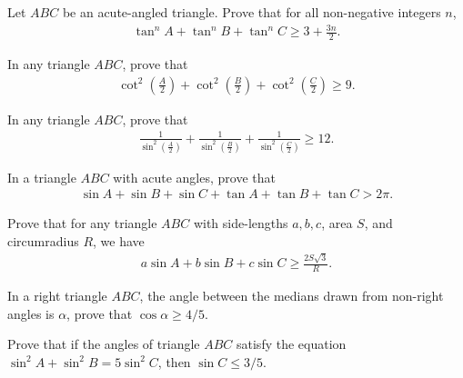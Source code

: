 \documentclass[12pt,a4paper]{memoir}
\theoremstyle{definition}
\begin{document}
\begin{question}
	Let $ABC$ be an acute-angled triangle. Prove that for all non-negative integers $n$,
	\begin{align*}
		\tan^n A + \tan^n B + \tan^n C \geq 3+\frac{3n}{2}.
	\end{align*}
\end{question}


\begin{question}
	In any triangle $ABC$, prove that
	\begin{align*}
		\cot^2\left(\frac{A}{2}\right) + \cot^2\left(\frac{B}{2}\right) + \cot^2\left(\frac{C}{2}\right) \geq 9.
	\end{align*}
\end{question}



\begin{question}
	In any triangle $ABC$, prove that
	\begin{align*}
		\frac{1}{\displaystyle\sin^2\left(\frac{A}{2}\right)}+\frac{1}{\displaystyle\sin^2\left(\frac{B}{2}\right)}+\frac{1}{\displaystyle\sin^2\left(\frac{C}{2}\right)} \geq 12.
	\end{align*}
\end{question}

\begin{question}
	In a triangle $ABC$ with acute angles, prove that
	\begin{align*}
		\sin A + \sin B + \sin C + \tan A + \tan B + \tan C > 2\pi. 
	\end{align*}
\end{question}


\begin{question}
	Prove that for any triangle $ABC$ with side-lengths $a,b,c$, area $S$, and circumradius $R$, we have
	\begin{align*}
		a\sin A + b\sin B + c\sin C \geq \frac{2S\sqrt{3}}{R}.
	\end{align*}
\end{question}

\begin{question}
	In a right triangle $ABC$, the angle between the medians drawn from non-right angles is $\alpha$, prove that $\cos \alpha \geq 4/5$.
\end{question}


\begin{question}
	Prove that if the angles of triangle $ABC$ satisfy the equation $\sin^2 A + \sin^2 B = 5\sin^2 C$, then $\sin C \leq 3/5$.
\end{question}
\end{document}
